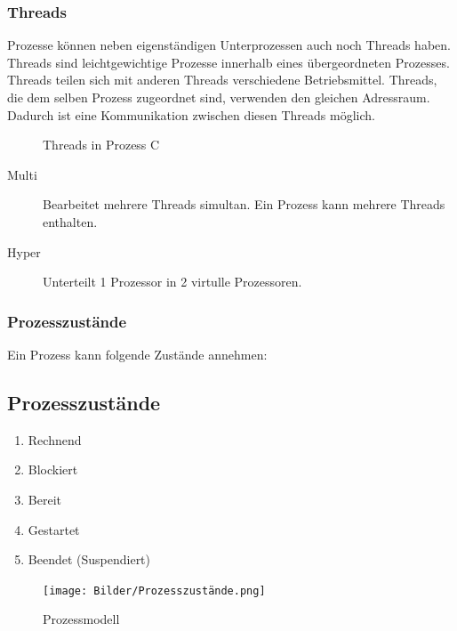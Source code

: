 \documentclass[12pt,a4paper]{article}
\begin{document}
	\subsubsection{Threads}
	Prozesse können neben eigenständigen Unterprozessen auch noch Threads haben. Threads sind leichtgewichtige Prozesse innerhalb eines übergeordneten Prozesses. Threads teilen sich mit anderen Threads verschiedene Betriebsmittel. Threads, die dem selben Prozess zugeordnet sind, verwenden den gleichen Adressraum. Dadurch ist eine Kommunikation zwischen diesen Threads möglich.
		\begin{figure}[h]
			\centering
			\caption{Threads in Prozess C}
		\end{figure}
		\begin{description}
			\item[Multi] Bearbeitet mehrere Threads simultan. Ein Prozess kann mehrere Threads enthalten.
			\item[Hyper] Unterteilt 1 Prozessor in 2 virtulle Prozessoren.
		\end{description}
		
	\subsubsection{Prozesszustände}
	Ein Prozess kann folgende Zustände annehmen:
	\subsection{Prozesszustände}
	\begin{enumerate}
		\item Rechnend
		\item Blockiert
		\item Bereit 
		\item Gestartet
		\item Beendet (Suspendiert)
	\end{enumerate}

	\begin{figure}[H]
		\centering
		\texttt{[image: Bilder/Prozesszustände.png]}
		\caption{Prozessmodell}
	\end{figure}
		
\end{document}

